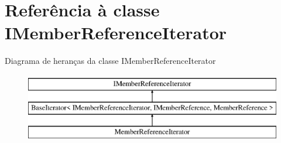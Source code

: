 \hypertarget{class_i_member_reference_iterator}{\section{Referência à classe I\-Member\-Reference\-Iterator}
\label{class_i_member_reference_iterator}
}
Diagrama de heranças da classe I\-Member\-Reference\-Iterator\begin{figure}[H]
\begin{center}
\leavevmode
\includegraphics[height=3.000000cm]{class_i_member_reference_iterator}
\end{center}
\end{figure}
